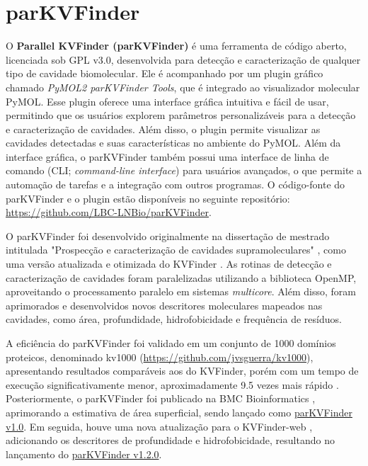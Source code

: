 \documentclass[Portugues]{phdquali}
\newcommand{\link}[1]{{\color{blue}\href{#1}{#1}}}
\begin{document}
\section{parKVFinder}

O \textbf{Parallel KVFinder (parKVFinder)} \cite{guerra2020} é uma ferramenta de código aberto, licenciada sob GPL v3.0, desenvolvida para detecção e caracterização de qualquer tipo de cavidade biomolecular. Ele é acompanhado por um plugin gráfico chamado \textit{PyMOL2 parKVFinder Tools}, que é integrado ao visualizador molecular PyMOL. Esse plugin oferece uma interface gráfica intuitiva e fácil de usar, permitindo que os usuários explorem parâmetros personalizáveis para a detecção e caracterização de cavidades. Além disso, o plugin permite visualizar as cavidades detectadas e suas características no ambiente do PyMOL. Além da interface gráfica, o parKVFinder também possui uma interface de linha de comando (CLI; \textit{command-line interface}) para usuários avançados, o que permite a automação de tarefas e a integração com outros programas. O código-fonte do parKVFinder e o plugin estão disponíveis no seguinte repositório: \link{https://github.com/LBC-LNBio/parKVFinder}.

O parKVFinder foi desenvolvido originalmente na dissertação de mestrado intitulada "Prospecção e caracterização de cavidades supramoleculares" \cite{guerra2019}, como uma versão atualizada e otimizada do KVFinder \cite{oliveira2014}. 
As rotinas de detecção e caracterização de cavidades foram paralelizadas utilizando a biblioteca OpenMP, aproveitando o processamento paralelo em sistemas \textit{multicore}. Além disso, foram aprimorados e desenvolvidos novos descritores moleculares mapeados nas cavidades, como área, profundidade, hidrofobicidade e frequência de resíduos.

A eficiência do parKVFinder foi validado em um conjunto de 1000 domínios proteicos, denominado kv1000 (\link{https://github.com/jvsguerra/kv1000}), apresentando resultados comparáveis aos do KVFinder, porém com um tempo de execução significativamente menor, aproximadamente 9.5 vezes mais rápido \cite{guerra2019,guerra2020}. Posteriormente, o parKVFinder foi publicado na BMC Bioinformatics \cite{guerra2020}, aprimorando a estimativa de área superficial, sendo lançado como \href{https://github.com/LBC-LNBio/parKVFinder/tree/v1.0}{parKVFinder v1.0}. Em seguida, houve uma nova atualização para o KVFinder-web \cite{guerra2023A}, adicionando os descritores de profundidade e hidrofobicidade, resultando no lançamento do \href{https://github.com/LBC-LNBio/parKVFinder/tree/v1.2.0}{parKVFinder v1.2.0}.
\end{document}
